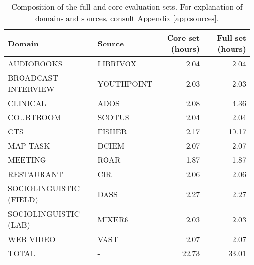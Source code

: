\documentclass{article}
\begin{document}
\begin{table}[H]
    \centering
        \begin{tabular}{llrr}
        \hline
         {\bf Domain}                & {\bf Source}  &  {\bf Core set (hours)}   &   {\bf Full set (hours)} \\
        \hline
         AUDIOBOOKS                  & LIBRIVOX      &  2.04                     &    2.04 \\
         BROADCAST INTERVIEW         & YOUTHPOINT    &  2.03                     &    2.03\\
         CLINICAL                    & ADOS          &  2.08                     &    4.36 \\
         COURTROOM                   & SCOTUS        &  2.04                     &    2.04 \\
         CTS                         & FISHER        &  2.17                     &   10.17 \\
         MAP TASK                    & DCIEM         &  2.07                     &    2.07 \\
         MEETING                     & ROAR          &  1.87                     &    1.87 \\
        RESTAURANT                   & CIR           &  2.06                     &    2.06 \\
         SOCIOLINGUISTIC (FIELD)     & DASS          &  2.27                     &    2.27 \\
         SOCIOLINGUISTIC (LAB)       & MIXER6        &  2.03                     &    2.03\\
         WEB VIDEO                   & VAST          &  2.07                     &    2.07 \\
         \hline
         TOTAL                       & -             & 22.73                     &   33.01 \\
        \hline
        \end{tabular}
    \caption{Composition of the full and core evaluation sets. For explanation of domains and sources, consult Appendix \ref{app:sources}.}
    \label{tab:single_chan_eval_set}
\end{table}
\end{document}
